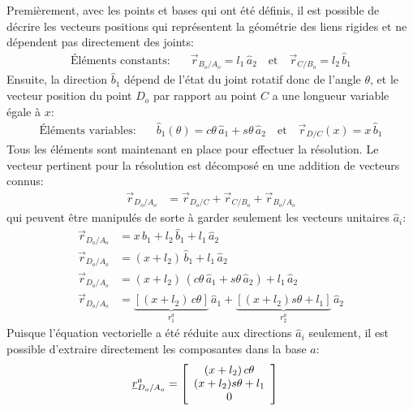 Premièrement, avec les points et bases qui ont été définis, il est possible de décrire les vecteurs positions qui représentent la géométrie des liens rigides et ne dépendent pas directement des joints:
\begin{align}
	\text{Éléments constants:}& \quad \vec{r}_{B_o/A_o} = l_1 \, \hat{a}_2  \quad \text{et} \quad  \vec{r}_{C/B_o} = l_2 \, \hat{b}_1
\end{align}
Ensuite, la direction $\hat{b}_1$ dépend de l'état du joint rotatif donc de l'angle $\theta$, et le vecteur position du point $D_o$ par rapport au point $C$ a une longueur variable égale à $x$:
\begin{align}
	\text{Éléments variables:}& \quad \hat{b}_1(\theta) = c\theta \, \hat{a}_1  + s\theta \, \hat{a}_2  \quad \text{et} \quad  \vec{r}_{D/C}(x) = x \, \hat{b}_1
\end{align}
Tous les éléments sont maintenant en place pour effectuer la résolution. Le vecteur pertinent pour la résolution est décomposé en une addition de vecteurs connus:
\begin{align}
	\vec{r}_{D_o/A_o}   &=  \vec{r}_{D_o/C} + \vec{r}_{C/B_o} + \vec{r}_{B_o/A_o}
\end{align}
qui peuvent être manipulés de sorte à garder seulement les vecteurs unitaires $\hat{a}_i$:
\begin{align}
	\vec{r}_{D_o/A_o}   &=  x \, \hat{b}_1  + l_2 \, \hat{b}_1 + l_1 \, \hat{a}_2 \\
	\vec{r}_{D_o/A_o}   &=            ( x + l_2 ) \, \hat{b}_1 + l_1 \, \hat{a}_2 \\
	\vec{r}_{D_o/A_o}   &=  ( x + l_2 ) \, (  c\theta \, \hat{a}_1  + s\theta \, \hat{a}_2 ) + l_1 \, \hat{a}_2 \\
	\vec{r}_{D_o/A_o}   &=  \underbrace{\left[  ( x + l_2 ) \, c\theta \right]}_{r_1^a}  \, \hat{a}_1  + \underbrace{\left[ ( x + l_2 ) s\theta  + l_1 \right]}_{r_2^a} \, \hat{a}_2
\end{align}
Puisque l'équation vectorielle a été réduite aux directions $\hat{a}_i$ seulement, il est possible d'extraire directement les composantes dans la base $a$:
\begin{align}
	\underline{r}_{D_o/A_o}^a   &=  \left[ \begin{array}{c}
										 ( x + l_2 ) \, c\theta \\ ( x + l_2 ) s\theta  + l_1 \\ 0
	\end{array} \right]
\end{align}

